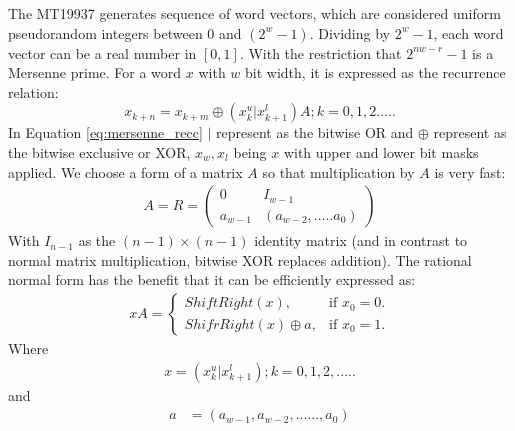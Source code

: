 \documentclass[conference]{IEEEtran}
\begin{document}
The MT19937 generates sequence of word vectors, which are considered uniform pseudorandom integers between $0$ and $(2^{w}-1)$\cite{MT19937}. Dividing by $2^{w}-1$, each word vector can be a real number in $[0, 1]$. With the restriction that $2^{nw-r}-1$ is a Mersenne prime. For a word $x$ with $w$ bit width, it is expressed as the recurrence relation:
\begin{equation}
\label{eq:mersenne_recc}
x_{k+n} =  x_{k+m} \oplus (x^{u}_{k} | x^{l}_{k+1})A; k=0,1,2.....
\end{equation}
In Equation \ref{eq:mersenne_recc} $|$ represent as the bitwise OR and $\oplus$ represent as the bitwise exclusive or XOR, $x_w, x_l$ being $x$ with upper and lower bit masks applied. We choose a form of a matrix $A$ so that multiplication by $A$ is very fast:
\begin{align}
A = R = \begin{pmatrix} 0 & I_{w-1} \\ a_{w-1} & (a_{w-2},.....a_{0}) \end{pmatrix} 
\end{align}
With $I_{n-1}$ as the $(n-1) \times (n-1)$ identity matrix (and in contrast to normal matrix multiplication, bitwise XOR replaces addition). The rational normal form has the benefit that it can be efficiently expressed as:
\begin{align}
xA = \begin{cases}
	ShiftRight(x), & \text{if $x_0 = 0$}.\\
    	ShifrRight(x)\oplus a, & \text{if $x_{0} = 1$}.
	\end{cases}
\end{align}
Where
\begin{align}
x = (x^{u}_{k} | x^{l}_{k+1}); k = 0, 1, 2, .....
\end{align}
and
\begin{align*}
a &= (a_{w-1}, a_{w-2}, ......, a_{0}) \\
\end{align*}
\end{document}
